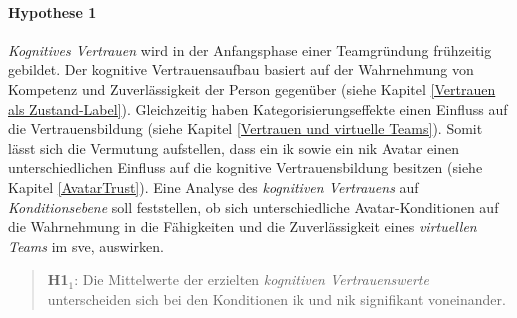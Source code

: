 \documentclass[a4paper,11pt]{article}%
\renewcommand{\\}{\vspace*{0.5\baselineskip} \newline}
\begin{document}
\paragraph{Hypothese 1}
\textit{Kognitives Vertrauen} wird in der Anfangsphase einer Teamgründung frühzeitig gebildet.
Der kognitive Vertrauensaufbau basiert auf der Wahrnehmung von Kompetenz und Zuverlässigkeit der Person gegenüber (siehe Kapitel \ref{Vertrauen als Zustand-Label}). Gleichzeitig haben Kategorisierungseffekte einen Einfluss auf die Vertrauensbildung (siehe Kapitel \ref{Vertrauen und virtuelle Teams}). Somit lässt sich die Vermutung aufstellen, dass ein \ac{ik} sowie ein \ac{nik} Avatar einen unterschiedlichen Einfluss auf die kognitive Vertrauensbildung besitzen (siehe Kapitel \ref{AvatarTrust}).
Eine Analyse des \textit{kognitiven Vertrauens} auf \textit{Konditionsebene} soll feststellen, ob sich unterschiedliche Avatar-Konditionen auf die Wahrnehmung in die Fähigkeiten und die Zuverlässigkeit eines \textit{virtuellen Teams} im \ac{sve}, auswirken.
\begin{quote}
\textbf{H1$_{1}$}: Die Mittelwerte der erzielten \textit{kognitiven Vertrauenswerte} unterscheiden sich bei den Konditionen \ac{ik} und \ac{nik} signifikant voneinander.
\end{quote}
\end{document}
